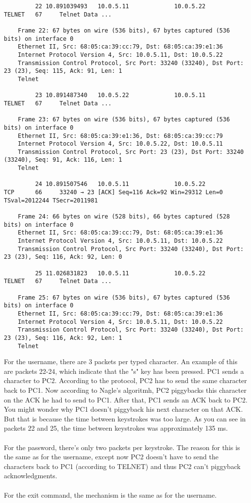 \begin{verbatim}
		 22 10.891039493   10.0.5.11             10.0.5.22             TELNET   67     Telnet Data ...
		 
	Frame 22: 67 bytes on wire (536 bits), 67 bytes captured (536 bits) on interface 0
	Ethernet II, Src: 68:05:ca:39:cc:79, Dst: 68:05:ca:39:e1:36
	Internet Protocol Version 4, Src: 10.0.5.11, Dst: 10.0.5.22
	Transmission Control Protocol, Src Port: 33240 (33240), Dst Port: 23 (23), Seq: 115, Ack: 91, Len: 1
	Telnet

		 23 10.891487340   10.0.5.22             10.0.5.11             TELNET   67     Telnet Data ...

	Frame 23: 67 bytes on wire (536 bits), 67 bytes captured (536 bits) on interface 0
	Ethernet II, Src: 68:05:ca:39:e1:36, Dst: 68:05:ca:39:cc:79
	Internet Protocol Version 4, Src: 10.0.5.22, Dst: 10.0.5.11
	Transmission Control Protocol, Src Port: 23 (23), Dst Port: 33240 (33240), Seq: 91, Ack: 116, Len: 1
	Telnet

		 24 10.891507546   10.0.5.11             10.0.5.22             TCP      66     33240 → 23 [ACK] Seq=116 Ack=92 Win=29312 Len=0 TSval=2012244 TSecr=2011981

	Frame 24: 66 bytes on wire (528 bits), 66 bytes captured (528 bits) on interface 0
	Ethernet II, Src: 68:05:ca:39:cc:79, Dst: 68:05:ca:39:e1:36
	Internet Protocol Version 4, Src: 10.0.5.11, Dst: 10.0.5.22
	Transmission Control Protocol, Src Port: 33240 (33240), Dst Port: 23 (23), Seq: 116, Ack: 92, Len: 0

		 25 11.026831823   10.0.5.11             10.0.5.22             TELNET   67     Telnet Data ...

	Frame 25: 67 bytes on wire (536 bits), 67 bytes captured (536 bits) on interface 0
	Ethernet II, Src: 68:05:ca:39:cc:79, Dst: 68:05:ca:39:e1:36
	Internet Protocol Version 4, Src: 10.0.5.11, Dst: 10.0.5.22
	Transmission Control Protocol, Src Port: 33240 (33240), Dst Port: 23 (23), Seq: 116, Ack: 92, Len: 1
	Telnet
\end{verbatim}

For the username, there are 3 packets per typed character. An example of this are packets 22-24, which indicate that the "s" key has been pressed.
PC1 sends a character to PC2. According to the protocol, PC2 has to send the same character back to PC1. Now according to Nagle's algoritmh, PC2 piggybacks this character on the ACK he had to send to PC1.
After that, PC1 sends an ACK back to PC2.
You might wonder why PC1 doesn't piggyback his next character on that ACK. But that is because the time between keystrokes was too large. As you can see in packets 22 and 25, the time between keystrokes was approximately 135 ms. \\
\\
For the password, there's only two packets per keystroke. The reason for this is the same as for the username, except now PC2 doesn't have to send the characters back to PC1 (according to TELNET) and thus PC2 can't piggyback acknowledgments. \\
\\
For the exit command, the mechanism is the same as for the username.